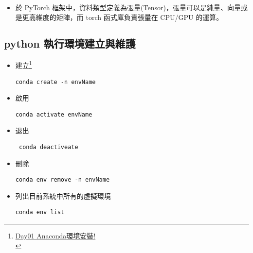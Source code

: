 \documentclass[a4paper,12pt]{article}
\begin{document}
\begin{enumerate}
\begin{enumerate}
\begin{itemize}
榜 Python First ，為量身替 Python 語言所打造，使用起來就跟寫一般 Python 專案沒\\
兩樣，也能和其他 Python 套件無痛整合。PyTorch 的優勢在於其概念相當直觀且語法簡\\
潔優雅，因此視為新手入門的一個好選項；再來其輕量架構讓模型得以快速訓練且有效運\\
用資源。\footnote{\href{https://medium.com/pyladies-taiwan/\%E6\%B7\%B1\%E5\%BA\%A6\%E5\%AD\%B8\%E7\%BF\%92\%E6\%96\%B0\%E6\%89\%8B\%E6\%9D\%91-pytorch\%E5\%85\%A5\%E9\%96\%80-511df3c1c025}{深度學習新手村：PyTorch入門}\\}\\
\item 於 PyTorch 框架中，資料類型定義為張量(Tensor)，張量可以是純量、向量或是更高維度的矩陣，而 torch 函式庫負責張量在 CPU/GPU 的運算。\\
\end{itemize}
\end{enumerate}
\end{enumerate}
\subsection{python 執行環境建立與維護}
\label{sec:org6ce533d}
\begin{itemize}
\item 建立\footnote{\href{https://ithelp.ithome.com.tw/articles/10192460}{Day01 Anaconda環境安裝!}\\\label{org43bd2be}}\\
\lstset{breaklines=true,language=shell,label= ,caption= ,captionpos=b,numbers=none}
\begin{lstlisting}
conda create -n envName
\end{lstlisting}
\item 啟用\\
\lstset{breaklines=true,language=shell,label= ,caption= ,captionpos=b,numbers=none}
\begin{lstlisting}
conda activate envName
\end{lstlisting}
\item 退出\\
\lstset{breaklines=true,language=shell,label= ,caption= ,captionpos=b,numbers=none}
\begin{lstlisting}
 conda deactiveate
\end{lstlisting}
\item 刪除\\
\lstset{breaklines=true,language=shell,label= ,caption= ,captionpos=b,numbers=none}
\begin{lstlisting}
conda env remove -n envName
\end{lstlisting}
\item 列出目前系統中所有的虛擬環境\\
\lstset{breaklines=true,language=shell,label= ,caption= ,captionpos=b,numbers=none}
\begin{lstlisting}
conda env list
\end{lstlisting}
\end{itemize}
\end{document}
